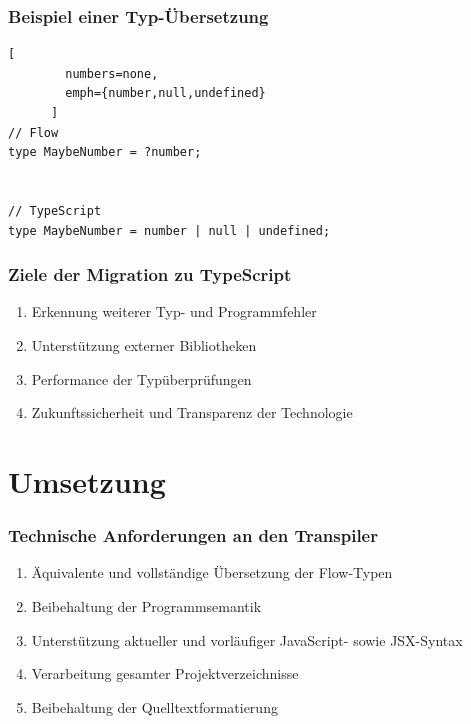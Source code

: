
    \begin{frame}[fragile]
      \frametitle{Beispiel einer Typ-Übersetzung}

      \begin{lstlisting}[
        numbers=none,
        emph={number,null,undefined}
      ]
// Flow
type MaybeNumber = ?number;


// TypeScript
type MaybeNumber = number | null | undefined;
      \end{lstlisting}
    \end{frame}

    \begin{frame}
      \frametitle{Ziele der Migration zu TypeScript}
      \begin{enumerate}
        \item Erkennung weiterer Typ- und Programmfehler
        \item Unterstützung externer Bibliotheken
        \item Performance der Typüberprüfungen
        \item Zukunftssicherheit und Transparenz der Technologie
      \end{enumerate}
    \end{frame}

  \section{Umsetzung}

    \begin{frame}
      \frametitle{Technische Anforderungen an den Transpiler}
      \begin{enumerate}
        \item Äquivalente und vollständige Übersetzung der Flow-Typen
        \item Beibehaltung der Programmsemantik
        \item Unterstützung aktueller und vorläufiger JavaScript- sowie JSX-Syntax
        \item Verarbeitung gesamter Projektverzeichnisse
        \item Beibehaltung der Quelltextformatierung
      \end{enumerate}
    \end{frame}

